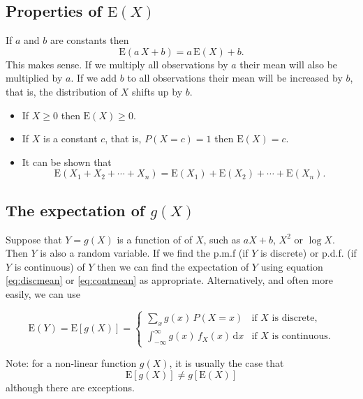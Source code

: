 \documentclass[
  british,
  11pt,
  openany, a4paper]{book}
\providecommand{\tightlist}{%
  \setlength{\itemsep}{0pt}\setlength{\parskip}{0pt}}
\begin{document}
\subsection{\texorpdfstring{Properties of \(\mathrm{E}(X)\)}{Properties of \textbackslash mathrm\{E\}(X)}}\label{properties-of-mathrmex}

If \(a\) and \(b\) are constants then
\[ \mathrm{E}(a\,X+b) = a\,\mathrm{E}(X)+b. \]
This makes sense. If we multiply all observations by \(a\) their mean will also be multiplied by \(a\). If we add \(b\) to all observations their mean will be increased by \(b\), that is, the distribution of \(X\) shifts up by \(b\).

\begin{itemize}
\tightlist
\item
  If \(X \geq 0\) then \(\mathrm{E}(X) \geq 0\).
\item
  If \(X\) is a constant \(c\), that is, \(P(X=c)=1\) then \(\mathrm{E}(X)=c\).
\item
  It can be shown that
  \[ \mathrm{E}(X_1 + X_2 + \cdots + X_n) = \mathrm{E}(X_1) + \mathrm{E}(X_2) + \cdots + \mathrm{E}(X_n). \]
\end{itemize}

\subsection{\texorpdfstring{The expectation of \(g(X)\)}{The expectation of g(X)}}\label{EgX}

Suppose that \(Y=g(X)\) is a function of of \(X\), such as \(aX+b\), \(X^2\) or \(\log X\). Then \(Y\) is also a random variable. If we find the p.m.f (if \(Y\) is discrete) or p.d.f. (if \(Y\) is continuous) of \(Y\) then we can find the expectation of \(Y\) using equation \eqref{eq:discmean} or \eqref{eq:contmean} as appropriate. Alternatively, and often more easily, we can use

\begin{equation}
\mathrm{E}(Y) = \mathrm{E}[g(X)] =
\begin{cases} 
\displaystyle\sum_x g(x)\,P(X=x) & \text{if } X \text{ is discrete}, \\
\int_{-\infty}^{\infty} g(x)\,f_X(x) \,\mathrm{d}x & \text{if } X \text{ is continuous}.
\end{cases}
\label{eq:expfn}
\end{equation}

Note: for a non-linear function \(g(X)\), it is usually the case that
\[ \mathrm{E}[g(X)] \neq g[\mathrm{E}(X)] \]
although there are exceptions.
\end{document}
